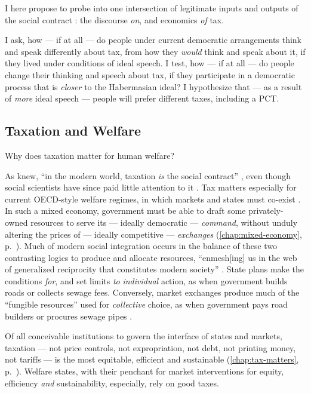 I here propose to probe into one intersection of legitimate inputs and outputs of the social contract \citep[compare][]{Scharpf1997}: the discourse \emph{on}, and economics \emph{of} tax.

I ask, how --- if at all --- do people under current democratic arrangements think and speak differently about tax, from how they \emph{would} think and speak about it, if they lived under conditions of ideal speech.
I test, how --- if at all --- do people change their thinking and speech about tax, if they participate in a democratic process that is \emph{closer} to the Habermasian ideal?
I hypothesize that --- as a result of \emph{more} ideal speech --- people will prefer different taxes, including a \gls{PCT}.

\subsection{Taxation and Welfare}
Why does taxation matter for human welfare?

As \citeauthor{Schumpeter} knew, ``in the modern world, taxation \emph{is} the social contract'' \citep[1, emphasis in original]{Martin2009a}, even though social scientists have since paid little attention to it \citep[K191]{Tilly2009}.
Tax matters especially for current \gls{OECD}-style welfare regimes, in which markets and states must co-exist \citep{Stiglitz2011}.
In such a mixed economy, government must be able to draft some privately-owned resources to serve its --- ideally democratic --- \emph{command}, without unduly altering the prices of --- ideally competitive --- \emph{exchanges} \citep[165f]{Ardant1975} (\autoref{chap:mixed-economy}, p.~\pageref{chap:mixed-economy}).
Much of modern social integration occurs in the balance of these two contrasting logics to produce and allocate resources, ``enmesh[ing] us in the web of generalized reciprocity that constitutes modern society'' \citep[3]{Martin2009a}.
State plans make the conditions \emph{for}, and set limits \emph{to} \emph{individual} action, as when government builds roads or collects sewage fees.
Conversely, market exchanges produce much of the ``fungible resources'' used for \emph{collective} choice, as when government pays road builders or procures sewage pipes \cite[4]{Martin2009a}.

Of all conceivable institutions to govern the interface of states and markets, taxation --- not price controls, not expropriation, not debt, not printing money, not tariffs --- is the most equitable, efficient and sustainable \citep{MusgThet1959,Stiglitz2011} (\autoref{chap:tax-matters}, p.~\pageref{chap:tax-matters}). 
Welfare states, with their penchant for market interventions for equity, efficiency \emph{and} sustainability, especially, rely on good taxes.

